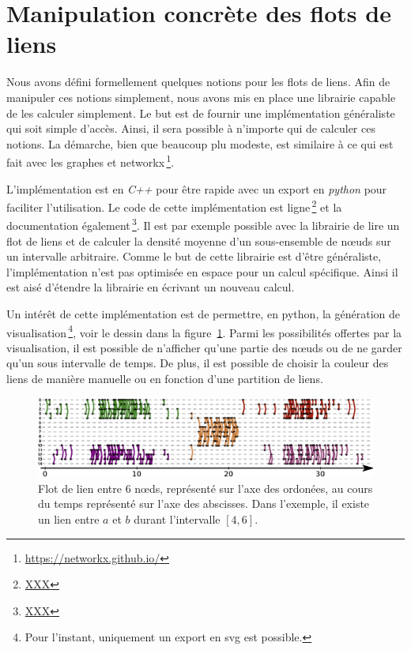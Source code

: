 \section{Manipulation concrète des flots de liens}

Nous avons défini formellement quelques notions pour les flots de liens.
Afin de manipuler ces notions simplement, nous avons mis en place une librairie capable de les calculer simplement.
Le but est de fournir une implémentation généraliste qui soit simple d'accès.
Ainsi, il sera possible à n'importe qui de calculer ces notions.
La démarche, bien que beaucoup plu modeste, est similaire à ce qui est fait avec les graphes et networkx\,\footnote{\url{https://networkx.github.io/}}.

L'implémentation est en \emph{C++} pour être rapide avec un export en \emph{python} pour faciliter l'utilisation.
Le code de cette implémentation est ligne\,\footnote{\url{XXX}} et la documentation également\,\footnote{\url{XXX}}.
Il est par exemple possible avec la librairie de lire un flot de liens et de calculer la densité moyenne d'un sous-ensemble de n\oe uds sur un intervalle arbitraire.
Comme le but de cette librairie est d'être généraliste, l'implémentation n'est pas optimisée en espace pour un calcul spécifique.
Ainsi il est aisé d'étendre la librairie en écrivant un nouveau calcul.
 

Un intérêt de cette implémentation est de permettre, en python, la génération de visualisation\,\footnote{Pour  l'instant, uniquement un export en svg est possible.}, voir le dessin dans la figure~\ref{fig:exemple_Flot_de_liens_lib}.
Parmi les possibilités offertes par la visualisation, il est possible de n'afficher qu'une partie des n\oe uds ou de ne garder qu'un sous intervalle de temps.
De plus, il est possible de choisir la couleur des liens de manière manuelle ou en fonction d'une partition de liens.

\begin{figure}
\centering
\includegraphics[width=\linewidth]{img/Intro/Dessin_Flot.eps}
\caption{Flot de lien entre $6$ n\oe ds, représenté sur l'axe des ordonées, au cours du temps représenté sur l'axe des abscisses.
Dans l'exemple, il existe un lien entre $a$ et $b$ durant l'intervalle $[4,6]$.
}
\label{fig:exemple_Flot_de_liens_lib}
\end{figure}


